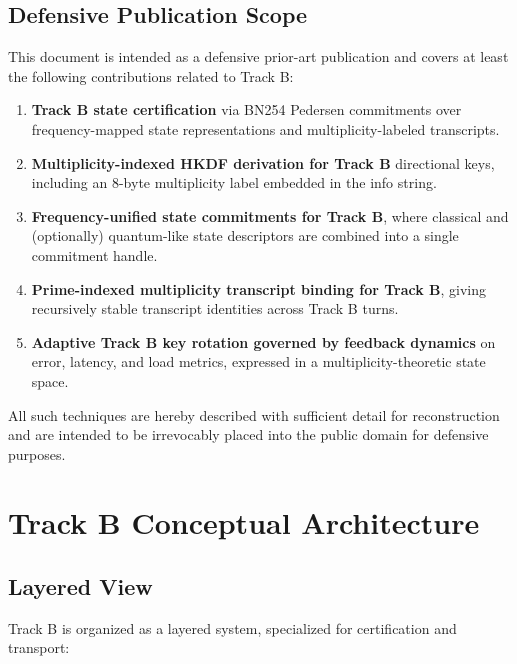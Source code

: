 \documentclass[11pt]{article}
\begin{document}
\subsection{Defensive Publication Scope}

This document is intended as a defensive prior-art publication and covers at least the following contributions related to Track B:

\begin{enumerate}[leftmargin=1.5em,label=\textbf{B.\arabic*}]
  \item \textbf{Track B state certification} via BN254 Pedersen commitments over frequency-mapped state representations and multiplicity-labeled transcripts.
  \item \textbf{Multiplicity-indexed HKDF derivation for Track B} directional keys, including an 8-byte multiplicity label embedded in the info string.
  \item \textbf{Frequency-unified state commitments for Track B}, where classical and (optionally) quantum-like state descriptors are combined into a single commitment handle.
  \item \textbf{Prime-indexed multiplicity transcript binding for Track B}, giving recursively stable transcript identities across Track B turns.
  \item \textbf{Adaptive Track B key rotation governed by feedback dynamics} on error, latency, and load metrics, expressed in a multiplicity-theoretic state space.
\end{enumerate}

All such techniques are hereby described with sufficient detail for reconstruction and are intended to be irrevocably placed into the public domain for defensive purposes.

\section{Track B Conceptual Architecture}

\subsection{Layered View}

Track B is organized as a layered system, specialized for certification and transport:
\end{document}
